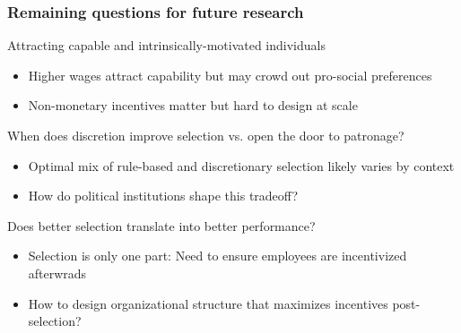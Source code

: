 \documentclass[aspectratio=169]{beamer}
\begin{document}
\begin{frame}
\frametitle{Remaining questions for future research}
Attracting capable and intrinsically-motivated individuals 
\begin{itemize}\setlength\itemsep{3pt}
\item Higher wages attract capability but may crowd out pro-social preferences
\item Non-monetary incentives matter but hard to design at scale
\end{itemize}\medskip
 When does discretion improve selection vs. open the door to patronage?
\begin{itemize}\setlength\itemsep{3pt}
\item Optimal mix of rule-based and discretionary selection likely varies by context
\item How do political institutions shape this tradeoff?
\end{itemize}\medskip

 Does better selection translate into better performance?
\begin{itemize}\setlength\itemsep{3pt}
\item Selection is only one part: Need to ensure employees are incentivized afterwrads
\item How to design organizational structure that maximizes incentives post-selection?
\end{itemize}
\end{frame}



\end{document}

